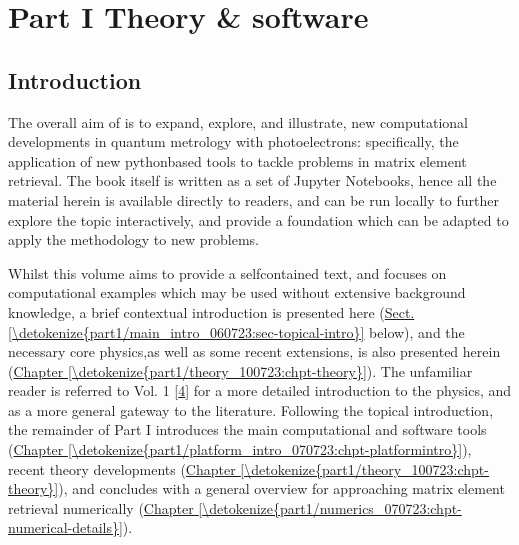 \documentclass[letterpaper,table,10pt,english]{jupyterBook}
\begin{document}
\sphinxstepscope


\part{Part I \sphinxhyphen{} Theory \& software}

\sphinxstepscope


\chapter{Introduction}
\label{\detokenize{part1/main_intro_060723:introduction}}\label{\detokenize{part1/main_intro_060723:chpt-intro}}\label{\detokenize{part1/main_intro_060723::doc}}
\sphinxAtStartPar
The overall aim of  is to expand, explore, and illustrate, new computational developments in quantum metrology with photoelectrons: specifically, the application of new python\sphinxhyphen{}based tools to tackle problems in matrix element retrieval. The book itself is written as a set of Jupyter Notebooks, hence all the material herein is available directly to readers, and can be run locally to further explore the topic interactively, and provide a foundation which can be adapted to apply the methodology to new problems.

\sphinxAtStartPar
Whilst this volume aims to provide a self\sphinxhyphen{}contained text, and focuses on computational examples which may be used without extensive background knowledge, a brief contextual introduction is presented here (\hyperref[\detokenize{part1/main_intro_060723:sec-topical-intro}]{Sect.\@ \ref{\detokenize{part1/main_intro_060723:sec-topical-intro}}} below), and the  necessary core physics,as well as some recent extensions, is also presented herein (\hyperref[\detokenize{part1/theory_100723:chpt-theory}]{Chapter \ref{\detokenize{part1/theory_100723:chpt-theory}}}). The unfamiliar reader is referred to  Vol. 1 {[}\hyperlink{cite.backmatter/bibliography:id677}{4}{]} for a more detailed introduction to the physics, and as a more general gateway to the literature. Following the topical introduction, the remainder of Part I introduces the main computational and software tools (\hyperref[\detokenize{part1/platform_intro_070723:chpt-platformintro}]{Chapter \ref{\detokenize{part1/platform_intro_070723:chpt-platformintro}}}), recent theory developments (\hyperref[\detokenize{part1/theory_100723:chpt-theory}]{Chapter \ref{\detokenize{part1/theory_100723:chpt-theory}}}), and concludes with a general overview for approaching matrix element retrieval numerically (\hyperref[\detokenize{part1/numerics_070723:chpt-numerical-details}]{Chapter \ref{\detokenize{part1/numerics_070723:chpt-numerical-details}}}).
\end{document}
